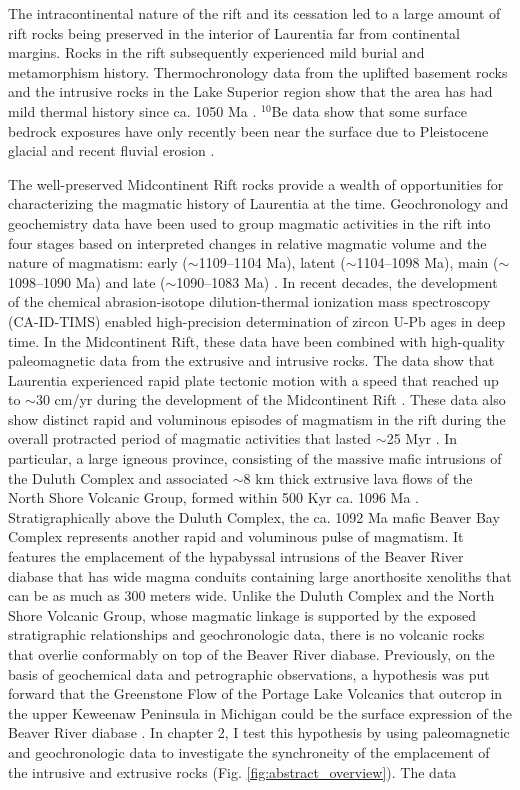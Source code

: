 The intracontinental nature of the rift and its cessation led to a large amount of rift rocks being preserved in the interior of Laurentia far from continental margins. Rocks in the rift subsequently experienced mild burial and metamorphism history. Thermochronology data from the uplifted basement rocks and the intrusive rocks in the Lake Superior region show that the area has had mild thermal history since ca. 1050 Ma \citep{Cannon1993a, Hartel2023a}. $^{10}$Be data show that some surface bedrock exposures have only recently been near the surface due to Pleistocene glacial and recent fluvial erosion \cite[e.g.][]{Ullman2015a}. 

The well-preserved Midcontinent Rift rocks provide a wealth of opportunities for characterizing the magmatic history of Laurentia at the time. Geochronology and geochemistry data have been used to group magmatic activities in the rift into four stages based on interpreted changes in relative magmatic volume and the nature of magmatism: early ($\sim$1109--1104 Ma), latent ($\sim$1104--1098 Ma), main ($\sim$1098--1090 Ma) and late ($\sim$1090--1083 Ma) \citep{Vervoort2007a, Heaman2007a, Miller2013a}. In recent decades, the development of the chemical abrasion-isotope dilution-thermal ionization mass spectroscopy (CA-ID-TIMS) enabled high-precision determination of zircon U-Pb ages in deep time. In the Midcontinent Rift, these data have been combined with high-quality paleomagnetic data from the extrusive and intrusive rocks. The data show that Laurentia experienced rapid plate tectonic motion with a speed that reached up to $\sim$30 cm/yr during the development of the Midcontinent Rift \citep{Swanson-Hysell2019a, Rose2022a}. These data also show distinct rapid and voluminous episodes of magmatism in the rift during the overall protracted period of magmatic activities that lasted $\sim$25 Myr \citep{Swanson-Hysell2019a, Swanson-Hysell2021a, Zhang2021b}. In particular, a large igneous province, consisting of the massive mafic intrusions of the Duluth Complex and associated $\sim$8 km thick extrusive lava flows of the North Shore Volcanic Group, formed within 500 Kyr ca. 1096 Ma \citep{Swanson-Hysell2021a}. Stratigraphically above the Duluth Complex, the ca. 1092 Ma mafic Beaver Bay Complex represents another rapid and voluminous pulse of magmatism. It features the emplacement of the hypabyssal intrusions of the Beaver River diabase that has wide magma conduits containing large anorthosite xenoliths that can be as much as 300 meters wide. Unlike the Duluth Complex and the North Shore Volcanic Group, whose magmatic linkage is supported by the exposed stratigraphic relationships and geochronologic data, there is no volcanic rocks that overlie conformably on top of the Beaver River diabase. Previously, on the basis of geochemical data and petrographic observations, a hypothesis was put forward that the Greenstone Flow of the Portage Lake Volcanics that outcrop in the upper Keweenaw Peninsula in Michigan could be the surface expression of the Beaver River diabase \citep{Doyle2016a}. In chapter 2, I test this hypothesis by using paleomagnetic and geochronologic data to investigate the synchroneity of the emplacement of the intrusive and extrusive rocks (Fig. \ref{fig:abstract_overview}). The data 